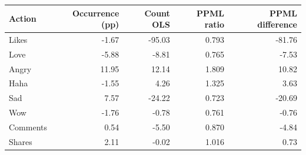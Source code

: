 \begin{tabular}{lrrrr}
\toprule
Action & Occurrence (pp) & Count OLS & PPML ratio & PPML difference \\
\midrule
Likes & -1.67 & -95.03 & 0.793 & -81.76 \\
Love & -5.88 & -8.81 & 0.765 & -7.53 \\
Angry & 11.95 & 12.14 & 1.809 & 10.82 \\
Haha & -1.55 & 4.26 & 1.325 & 3.63 \\
Sad & 7.57 & -24.22 & 0.723 & -20.69 \\
Wow & -1.76 & -0.78 & 0.761 & -0.76 \\
Comments & 0.54 & -5.50 & 0.870 & -4.84 \\
Shares & 2.11 & -0.02 & 1.016 & 0.73 \\
\bottomrule
\end{tabular}

